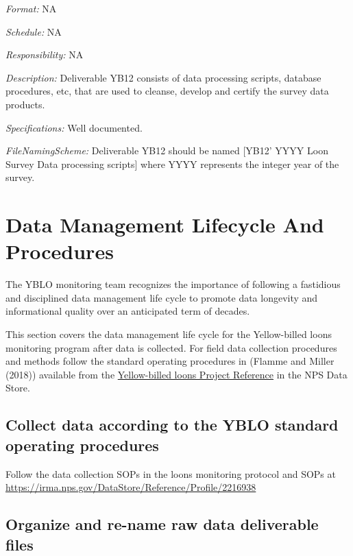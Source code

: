 \documentclass[
  letterpaper,
  DIV=11,
  numbers=noendperiod]{scrreprt}
\begin{document}

\emph{Format:} NA

\emph{Schedule:} NA

\emph{Responsibility:} NA

\emph{Description:} Deliverable YB12 consists of data processing
scripts, database procedures, etc, that are used to cleanse, develop and
certify the survey data products.

\emph{Specifications:} Well documented.

\emph{FileNamingScheme:} Deliverable YB12 should be named {[}YB12' YYYY
Loon Survey Data processing scripts{]} where YYYY represents the integer
year of the survey.


\chapter{Data Management Lifecycle And
Procedures}\label{data-management-lifecycle-and-procedures}

The YBLO monitoring team recognizes the importance of following a
fastidious and disciplined data management life cycle to promote data
longevity and informational quality over an anticipated term of decades.

This section covers the data management life cycle for the Yellow-billed
loons monitoring program after data is collected. For field data
collection procedures and methods follow the standard operating
procedures in (Flamme and Miller (2018)) available from the
\href{https://irma.nps.gov/DataStore/Reference/Profile/2216938}{Yellow-billed
loons Project Reference} in the NPS Data Store.

\section{Collect data according to the YBLO standard operating
procedures}\label{collect-data-according-to-the-yblo-standard-operating-procedures}

Follow the data collection SOPs in the loons monitoring protocol and
SOPs at \url{https://irma.nps.gov/DataStore/Reference/Profile/2216938}

\section{Organize and re-name raw data deliverable
files}\label{organize-and-re-name-raw-data-deliverable-files}
\end{document}
